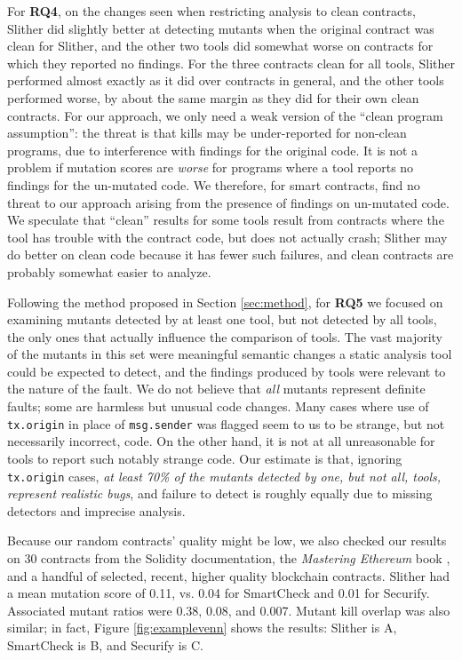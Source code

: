 For {\bf RQ4}, on the changes seen when restricting analysis to clean contracts, Slither did slightly better at detecting mutants when the original contract was clean for Slither, and the other two tools did somewhat worse on contracts for which they reported no findings.  For the three contracts clean for all tools, Slither performed almost exactly as it did over contracts in general, and the other tools performed worse, by about the same margin as they did for their own clean contracts.  For our approach, we only need a weak version of the ``clean program assumption'':  the threat is that kills may be under-reported for non-clean programs, due to interference with findings for the original code.  It is not a problem if mutation scores are \emph{worse} for programs where a tool reports no findings for the un-mutated code.  We therefore, for smart contracts, find no threat to our approach arising from the presence of findings on un-mutated code.  We speculate that ``clean'' results for some tools result from contracts where the tool has trouble with the contract code, but does not actually crash; Slither may do better on clean code because it has fewer such failures, and clean contracts are probably somewhat easier to analyze.

Following the method proposed in Section \ref{sec:method},  for {\bf RQ5} we focused on examining mutants detected by at least one tool, but not detected by all tools, the only ones that actually influence the comparison of tools.  The vast majority of the mutants in this set were meaningful semantic changes a static analysis tool could be expected to detect, and the findings produced by tools were relevant to the nature of the fault.  We do not believe that \emph{all} mutants represent definite faults; some are harmless but unusual code changes.  Many cases where use of {\tt tx.origin} in place of {\tt msg.sender} was flagged seem to us to be strange, but not necessarily incorrect, code.  On the other hand, it is not at all unreasonable for tools to report such notably strange code.   Our estimate is that, ignoring {\tt tx.origin} cases, \emph{at least 70\% of the mutants detected by one, but not all, tools, represent realistic bugs}, and failure to detect is roughly equally due to missing detectors and imprecise analysis.

Because our random contracts' quality might be low, we also checked our results on 30 contracts from the Solidity documentation, the \emph{Mastering Ethereum} book \cite{masteringEth}, and a handful of selected, recent, higher quality blockchain contracts.  Slither had a mean mutation score of 0.11, vs. 0.04 for SmartCheck and 0.01 for Securify.  Associated mutant ratios were 0.38, 0.08, and 0.007.  Mutant kill overlap was also similar; in fact, Figure \ref{fig:examplevenn} shows the results: Slither is A, SmartCheck is B, and Securify is C.

